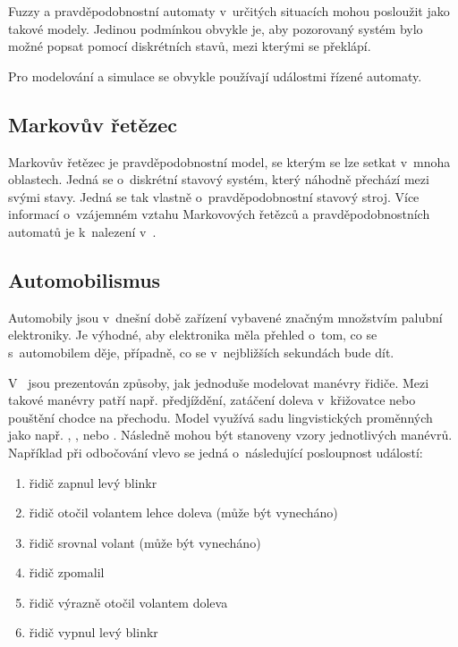 Fuzzy a pravděpodobnostní automaty v~určitých situacích mohou posloužit jako takové modely. Jedinou podmínkou obvykle je, aby pozorovaný systém bylo možné popsat pomocí diskrétních stavů, mezi kterými se překlápí. 

Pro modelování a simulace se obvykle používají událostmi řízené automaty.

\subsection{Markovův řetězec}
Markovův řetězec je pravděpodobnostní model, se kterým se lze setkat v~mnoha oblastech. Jedná se o~diskrétní stavový systém, který náhodně přechází mezi svými stavy. Jedná se tak vlastně o~pravděpodobnostní stavový stroj. Více informací o~vzájemném vztahu Markovových řetězců a pravděpodobnostních automatů je k~nalezení v~\cite{DupDenEsp-LiProAuHidMarMod+, Hac+-ProAnaLarFinStaMac}.

\subsection{Automobilismus}
Automobily jsou v~dnešní době zařízení vybavené značným množstvím palubní elektroniky. Je výhodné, aby elektronika měla přehled o~tom, co se s~automobilem děje, případně, co se v~nejbližších sekundách bude dít.

V~\cite{Hul+-ManRecUsProFinStaMacFuzLog, TriHei-ExpDesSeqFuzPer} jsou prezentován způsoby, jak jednoduše modelovat manévry řidiče. Mezi takové manévry patří např. předjíždění, zatáčení doleva v~křižovatce nebo pouštění chodce na přechodu. Model využívá sadu lingvistických proměnných jako např. , ,  nebo . Následně mohou být stanoveny vzory jednotlivých manévrů. Například při odbočování vlevo se jedná o~následující posloupnost událostí:
\begin{enumerate}
 \item řidič zapnul levý blinkr
 \item řidič otočil volantem lehce doleva (může být vynecháno)
 \item řidič srovnal volant (může být vynecháno)
 \item řidič zpomalil
 \item řidič výrazně otočil volantem doleva
 \item řidič vypnul levý blinkr
\end{enumerate}

